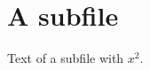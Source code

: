 \documentclass[../main.tex]{subfiles}
\begin{document}
\section{A subfile}
Text of a subfile with $x^2$.
\end{document}
